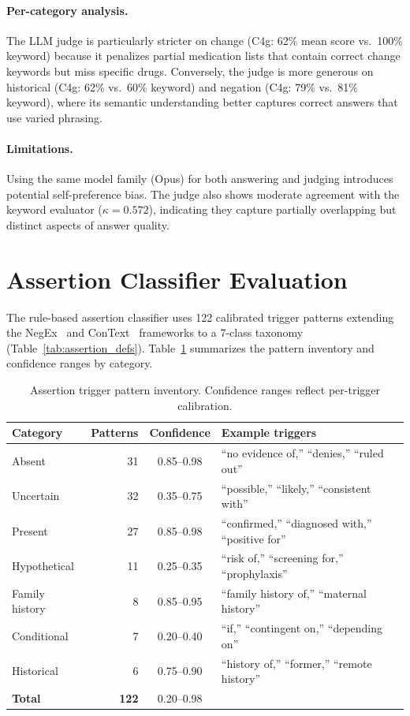 \paragraph{Per-category analysis.}
The LLM judge is particularly stricter on change (C4g: 62\% mean score vs.\ 100\% keyword) because it penalizes partial medication lists that contain correct change keywords but miss specific drugs.
Conversely, the judge is more generous on historical (C4g: 62\% vs.\ 60\% keyword) and negation (C4g: 79\% vs.\ 81\% keyword), where its semantic understanding better captures correct answers that use varied phrasing.

\paragraph{Limitations.}
Using the same model family (Opus) for both answering and judging introduces potential self-preference bias.
The judge also shows moderate agreement with the keyword evaluator ($\kappa = 0.572$), indicating they capture partially overlapping but distinct aspects of answer quality.


\section{Assertion Classifier Evaluation}
\label{app:assertion_eval}

The rule-based assertion classifier uses 122 calibrated trigger patterns extending the NegEx~\cite{chapman2001negex} and ConText~\cite{harkema2009context} frameworks to a 7-class taxonomy (Table~\ref{tab:assertion_defs}).
Table~\ref{tab:assertion_inventory} summarizes the pattern inventory and confidence ranges by category.

\begin{table}[ht]
\centering
\small
\caption{Assertion trigger pattern inventory. Confidence ranges reflect per-trigger calibration.}
\label{tab:assertion_inventory}
\begin{tabular}{@{}lrcl@{}}
\toprule
Category & Patterns & Confidence & Example triggers \\
\midrule
Absent & 31 & 0.85--0.98 & ``no evidence of,'' ``denies,'' ``ruled out'' \\
Uncertain & 32 & 0.35--0.75 & ``possible,'' ``likely,'' ``consistent with'' \\
Present & 27 & 0.85--0.98 & ``confirmed,'' ``diagnosed with,'' ``positive for'' \\
Hypothetical & 11 & 0.25--0.35 & ``risk of,'' ``screening for,'' ``prophylaxis'' \\
Family history & 8 & 0.85--0.95 & ``family history of,'' ``maternal history'' \\
Conditional & 7 & 0.20--0.40 & ``if,'' ``contingent on,'' ``depending on'' \\
Historical & 6 & 0.75--0.90 & ``history of,'' ``former,'' ``remote history'' \\
\midrule
\textbf{Total} & \textbf{122} & 0.20--0.98 & \\
\bottomrule
\end{tabular}
\end{table}


